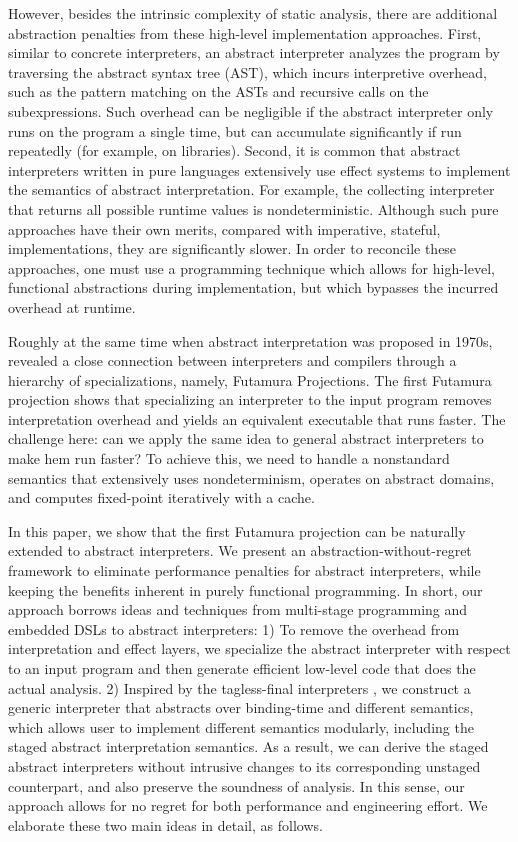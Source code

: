 However, besides the intrinsic complexity of static analysis, there are
additional abstraction penalties from these high-level implementation
approaches. First, similar to concrete interpreters, an abstract interpreter
analyzes the program by traversing the abstract syntax tree (AST), which incurs
interpretive overhead, such as the pattern matching on the ASTs and recursive
calls on the subexpressions. Such overhead can be negligible if the abstract
interpreter only runs on the program a single time, but can accumulate
significantly if run repeatedly (for example, on libraries).  Second, it is
common that abstract interpreters written in pure languages extensively use
effect systems to implement the semantics of abstract interpretation. For
example, the collecting interpreter that returns all possible runtime values is
nondeterministic.  Although such pure approaches have their own merits, compared
with imperative, stateful, implementations, they are significantly slower. In
order to reconcile these approaches, one must use a programming technique which
allows for high-level, functional abstractions during implementation, but which
bypasses the incurred overhead at runtime.

Roughly at the same time when abstract interpretation was proposed in
1970s, \citet{futamura1971partial, Futamura1999} revealed a close
connection between interpreters and compilers through a hierarchy of
specializations, namely, Futamura Projections. The first Futamura
projection shows that specializing an interpreter to the input program
removes interpretation overhead and yields an equivalent executable
that runs faster.  The challenge here: can we apply the same idea to
general abstract interpreters to make hem run faster?
To achieve this, we need to handle a nonstandard semantics that
extensively uses nondeterminism, operates on abstract domains, and
computes fixed-point iteratively with a cache.

In this paper, we show that the first Futamura projection can be naturally
extended to abstract interpreters. We present an abstraction-without-regret
framework to eliminate performance penalties for abstract interpreters, while
keeping the benefits inherent in purely functional programming. In short, our
approach borrows ideas and techniques from multi-stage programming and embedded
DSLs to abstract interpreters:  1) To remove the overhead from interpretation
and effect layers, we specialize the abstract interpreter with respect to an
input program and then generate efficient low-level code that does the actual
analysis.  2) Inspired by the tagless-final interpreters
\cite{DBLP:journals/jfp/CaretteKS09}, we construct a generic interpreter that
abstracts over binding-time and different semantics, which allows user to
implement different semantics modularly, including the staged abstract
interpretation semantics. As a result, we can derive the staged abstract
interpreters without intrusive changes to its corresponding unstaged
counterpart, and also preserve the soundness of analysis. In this sense, our
approach allows for no regret for both performance and engineering effort. We
elaborate these two main ideas in detail, as follows.

